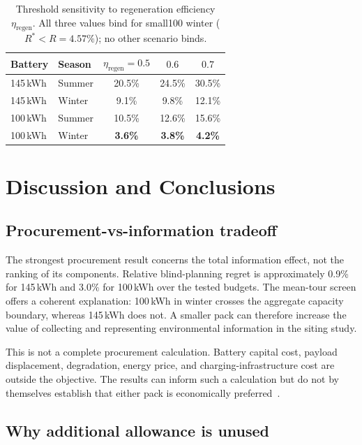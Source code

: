 \documentclass[review,3p,authoryear]{elsarticle}
\newcommand{\Rstar}{R^{*}}
\begin{document}
\begin{table}[ht]
\centering
\caption{Threshold sensitivity to regeneration efficiency
$\eta_{\text{regen}}$.  All three values bind for small100 winter
($\Rstar < R = 4.57\%$); no other scenario binds.}
\label{tab:sensitivity}
\begin{tabular}{llccc}
\toprule
Battery & Season & $\eta_{\text{regen}} = 0.5$ & $0.6$ & $0.7$ \\
\midrule
145\,kWh & Summer & 20.5\% & 24.5\% & 30.5\% \\
145\,kWh & Winter &  9.1\% &  9.8\% & 12.1\% \\
100\,kWh & Summer & 10.5\% & 12.6\% & 15.6\% \\
100\,kWh & Winter & \textbf{3.6\%} & \textbf{3.8\%} & \textbf{4.2\%} \\
\bottomrule
\end{tabular}
\end{table}

\section{Discussion and Conclusions}
\label{sec:discussion}

\subsection{Procurement-vs-information tradeoff}
\label{sec:procurement}

The strongest procurement result concerns the total information effect,
not the ranking of its components.  Relative blind-planning regret is
approximately 0.9\% for 145\,kWh and 3.0\% for 100\,kWh over the tested
budgets.  The mean-tour screen offers a coherent explanation: 100\,kWh
in winter crosses the aggregate capacity boundary, whereas 145\,kWh
does not.  A smaller pack can therefore increase the value of collecting
and representing environmental information in the siting study.

This is not a complete procurement calculation.  Battery capital cost,
payload displacement, degradation, energy price, and charging-infrastructure
cost are outside the objective.  The results can inform such a calculation
but do not by themselves establish that either pack is economically
preferred~\citep{Basma2022}.

\subsection{Why additional allowance is unused}
\label{sec:plateau_why}
\end{document}
